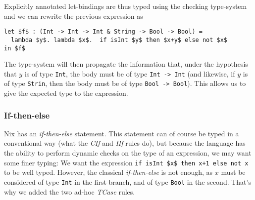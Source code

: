 Explicitly annotated let-bindings are thus typed using the checking type-system
and we can rewrite the previous expression as
\begin{lstlisting}[language=NLight]
let $f$ : (Int -> Int -> Int & String -> Bool -> Bool) =
  lambda $y$. lambda $x$.  if isInt $y$ then $x+y$ else not $x$
in $f$
\end{lstlisting}

The type-system will then propagate the information that, under the hypothesis
that $y$ is of type \lstinline{Int}, the body must be of type
\lstinline{Int -> Int} (and likewise, if $y$ is of type \lstinline{Strin}, then
the body must be of type \lstinline{Bool -> Bool}). This allows us to give the
expected type to the expression.

\subsubsection{If-then-else}
{
  \def\ite{\emph{if-then-else}}
Nix has an \emph{if-then-else} statement. This statement can of course be typed
in a conventional way (what the \emph{CIf} and \emph{IIf} rules do), but
because the language has the ability to perform dynamic checks on the type of
an expression, we may want some finer typing: We want the expression
\lstinline{if isInt $x$ then x+1 else not x} to be well typed. However, the
classical \ite{} is not enough, as $x$ must be considered of type
\lstinline{Int} in the first branch, and of type \lstinline{Bool} in the second.
That's why we added the two ad-hoc \emph{TCase} rules.
}

